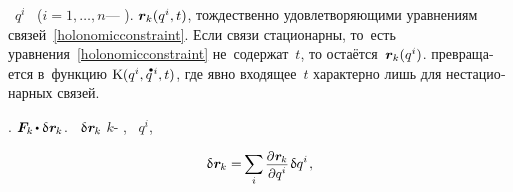 \begin{otherlanguage}{russian}
~$q^i$~%
(${i = 1, \ldots, n}$\:---
).
\hbox{}
${\bm{r}_{k}(q^i, t)}$,
тождественно удовлетворяющими
уравнениям связей~\eqref{holonomicconstraint}.
Если связи стационарны,
то~есть
уравнения~\eqref{holonomicconstraint}
не~содержат~$t$,
то остаётся~${\bm{r}_{k}(q^i)}$.
превращается
в~функцию
${\kineticenergyinmechanics \hspace{.1ex} (q^i, \mathdotabove{q}^{\hspace{.2ex}i}, t)}$,
где явно входящее~$t$
характерно лишь для нестационарных связей.

\newcommand\partialoflocationbycoordinatewithbothindices[2]{%
\scalebox{.93}{$ \displaystyle%
   \frac{\raisemath{-0.08em}{\partial \hspace{.1ex} \locationvector_{#1}}}%
        {\raisemath{-0.08em}{\partial q^{#2}}} $}}

.
${ \bm{F}_k \hspace{-0.2ex} \dotp \variation{\hspace{.1ex}\locationvector_{\hspace{-0.1ex}k}} }$.
~${\variation{\hspace{.1ex}\locationvector_{\hspace{-0.1ex}k}}}$
$k$\hbox{-}
,
~${q^i}$,

\nopagebreak\vspace{-0.25em}
\begin{equation}\label{locationexpandedforgeneralizedcoordinates}
\variation{\hspace{.1ex}\locationvector_{\hspace{-0.1ex}k}}
= \hspace{-0.2ex}
\scalebox{.95}[.98]{$ \displaystyle \sum_{\smash{i}} $} \hspace{.3ex}
\partialoflocationbycoordinatewithbothindices{\hspace{-0.1ex}k}{i} \hspace{.2ex} \variation{q^i}
\hspace{.2ex} ,
\end{equation}


\end{otherlanguage}
